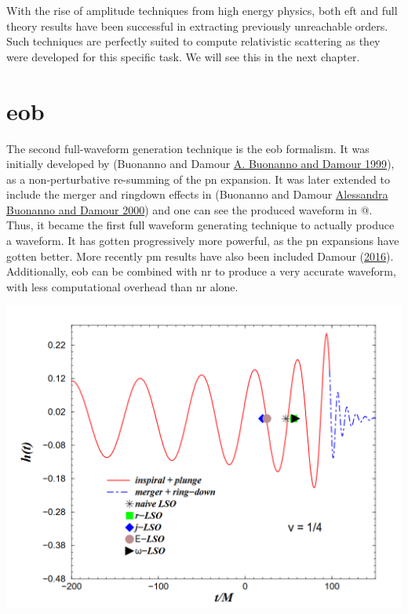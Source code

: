 \documentclass[
  11pt,
  a4paper,
  DIV=11,
  numbers=noendperiod,
  oneside]{scrreprt}
\DeclareRobustCommand{\[}{\begin{equation}}
\DeclareRobustCommand{\]}{\end{equation}}
\begin{document}
With the rise of amplitude techniques from high energy physics, both
\gls{eft} and full theory results have been successful in extracting
previously unreachable orders. Such techniques are perfectly suited to
compute relativistic scattering as they were developed for this specific
task. We will see this in the next chapter.

\hypertarget{eob}{%
\section{\texorpdfstring{\acrlong{eob}}{}}\label{eob}}

The second full-waveform generation technique is the \acrfull{eob}
formalism. It was initially developed by (Buonanno and Damour
\protect\hyperlink{ref-Buonanno:1998gg}{A. Buonanno and Damour 1999}),
as a non-perturbative re-summing of the \gls{pn} expansion. It was later
extended to include the merger and ringdown effects in (Buonanno and
Damour \protect\hyperlink{ref-Buonanno:2000ef}{Alessandra Buonanno and
Damour 2000}) and one can see the produced waveform in @. Thus, it
became the first full waveform generating technique to actually produce
a waveform. It has gotten progressively more powerful, as the \gls{pn}
expansions have gotten better. More recently \gls{pm} results have also
been included Damour (\protect\hyperlink{ref-Damour:2016gwp}{2016}).
Additionally, \gls{eob} can be combined with \gls{nr} to produce a very
accurate waveform, with less computational overhead than \gls{nr} alone.

\begin{marginfigure}


{\centering \includegraphics{./firsteob.png}

}

\end{marginfigure}
\end{document}
